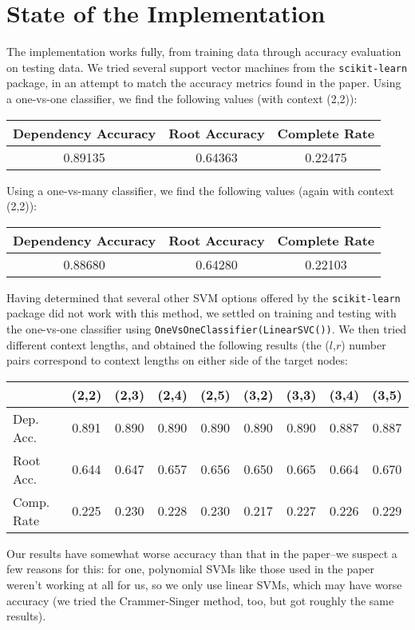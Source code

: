 \documentclass[12pt,fleqn]{article}
\begin{document}
    \section*{State of the Implementation}
    The implementation works fully, from training data through accuracy evaluation on testing data. We tried several support vector machines from the \texttt{scikit-learn} package, in an attempt to match the accuracy metrics found in the paper. Using a one-vs-one classifier, we find the following values (with context (2,2)):
    \begin{center}
        \begin{tabular}{|c|c|c|}
            \hline Dependency Accuracy & Root Accuracy & Complete Rate \\ \hline
            0.89135 & 0.64363 & 0.22475 \\ \hline
        \end{tabular}
    \end{center}
    Using a one-vs-many classifier, we find the following values (again with context (2,2)):
    \begin{center}
        \begin{tabular}{|c|c|c|}
            \hline Dependency Accuracy & Root Accuracy & Complete Rate \\ \hline
            0.88680 & 0.64280 & 0.22103 \\ \hline
        \end{tabular}
    \end{center}
    Having determined that several other SVM options offered by the \texttt{scikit-learn} package did not work with this method, we settled on training and testing with the one-vs-one classifier using \texttt{OneVsOneClassifier(LinearSVC())}. We then tried different context lengths, and obtained the following results (the ($l$,$r$) number pairs correspond to context lengths on either side of the target nodes:
    \begin{center}
        \begin{tabular}{|l|cccc|cccc|}
            \cline{2-9} \multicolumn{1}{c|}{} & (2,2) & (2,3) & (2,4) & (2,5) & (3,2) & (3,3) & (3,4) & (3,5) \\ \hline
            Dep. Acc. & 0.891 & 0.890 & 0.890 & 0.890 & 0.890 & 0.890 & 0.887 & 0.887 \\
            Root Acc. & 0.644 & 0.647 & 0.657 & 0.656 & 0.650 & 0.665 & 0.664 & 0.670 \\
            Comp. Rate & 0.225 & 0.230 & 0.228 & 0.230 & 0.217 & 0.227 & 0.226 & 0.229 \\ \hline
        \end{tabular}
    \end{center}
    Our results have somewhat worse accuracy than that in the paper--we suspect a few reasons for this: for one, polynomial SVMs like those used in the paper weren't working at all for us, so we only use linear SVMs, which may have worse accuracy (we tried the Crammer-Singer method, too, but got roughly the same results).
\end{document}
